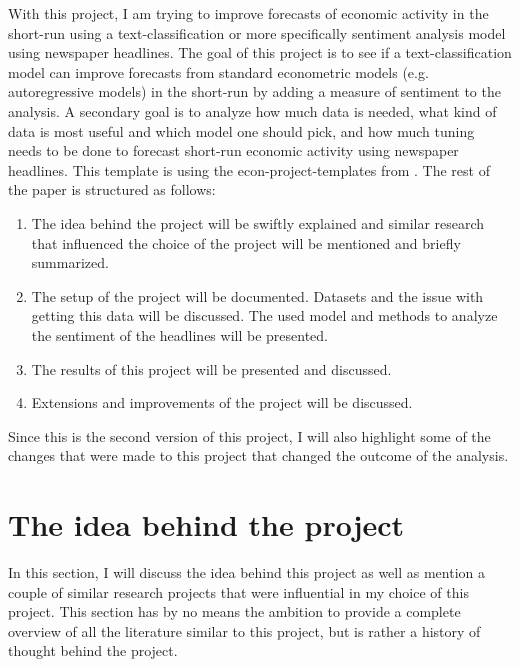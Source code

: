 \documentclass[11pt, a4paper, leqno]{article}
\begin{document}
With this project, I am trying to improve forecasts of economic activity in the short-run using a text-classification or more specifically sentiment analysis model using newspaper headlines. The goal of this project is to see if a text-classification model can improve forecasts from standard econometric models (e.g. autoregressive models) in the short-run by adding a measure of sentiment to the analysis.
A secondary goal is to analyze how much data is needed, what kind of data is most useful and which model one should pick, and how much tuning needs to be done to forecast short-run economic activity using newspaper headlines.
This template is using the econ-project-templates from \citet{Gaudecker2023}.
The rest of the paper is structured as follows:
\begin{enumerate}
    \item The idea behind the project will be swiftly explained and similar research that influenced the choice of the project will be mentioned and briefly summarized.
    \item The setup of the project will be documented. Datasets and the issue with getting this data will be discussed. The used model and methods to analyze the sentiment of the headlines will be presented.
    \item The results of this project will be presented and discussed.
    \item Extensions and improvements of the project will be discussed.
\end{enumerate}
Since this is the second version of this project, I will also highlight some of the changes that were made to this project that changed the outcome of the analysis.

\section{The idea behind the project}
In this section, I will discuss the idea behind this project as well as mention a couple of similar research projects that were influential in my choice of this project. This section has by no means the ambition to provide a complete overview of all the literature similar to this project, but is rather a history of thought behind the project.
\end{document}
